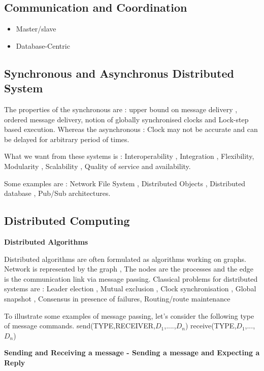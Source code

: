 \documentclass{article}
\begin{document}
\subsection{Communication and Coordination}
\begin{itemize}
    \item Master/slave 
    \item Database-Centric 
    
\end{itemize}
\subsection{Synchronous and Asynchronus Distributed System}
The properties of the synchronous are : upper bound on message delivery , ordered message delivery, notion of globally synchronised clocks and Lock-step based execution. Whereas the asynchronous : Clock may not be accurate and can be delayed for arbitrary period of times.

What we want from these systems is : Interoperability , Integration , Flexibility, Modularity , Scalability , Quality of service and availability.

Some examples are : Network File System , Distributed Objects , Distributed database , Pub/Sub architectures.

\subsection{Distributed Computing}

\textbf{Distributed Algorithms}
\vspace{3mm}

Distributed algorithms are often formulated as algorithms working on graphs. Network is represented by the graph , The nodes are the processes and the edge is the communication link via message passing. 
Classical problems for distributed systems are : Leader election , Mutual exclusion , Clock synchronisation , Global snapshot , Consensus in presence of failures, Routing/route maintenance

\vspace{2mm}

To illustrate some examples of message passing, let's consider the following type of message commands. send(TYPE,RECEIVER,$D_1$,....,$D_n$) receive(TYPE,$D_1$,...,$D_n$)

\vspace{2mm}
\textbf{Sending and Receiving a message - Sending a message and Expecting a Reply}
\end{document}
